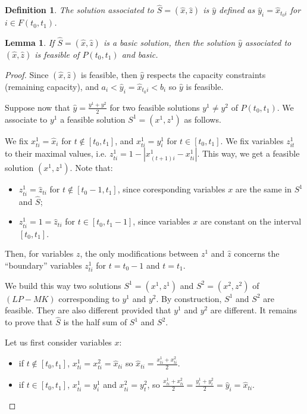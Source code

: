 \documentclass[a4paper]{book}
\newtheorem{lemma}{Lemma}[chapter]
\newtheorem{definition}{Definition}
\newtheorem{proof}{\noindent{\bf Proof.} }
\begin{document}
\begin{definition}
The solution associated to $\hat{S}=(\hat{x},\hat{z})$ is $\hat{y}$ defined as $\hat{y}_i=\hat{x}_{t_0i}$ for $i\in F(t_0,t_1)$.  
\end{definition}

\begin{lemma}\label{lem:basic}
If $\hat{S}=(\hat{x},\hat{z})$ is a basic solution, then the solution $\hat{y}$ associated to $(\hat{x},\hat{z})$ is feasible of $P(t_0,t_1)$ and basic. 
\end{lemma}

\begin{proof}
	Since $(\hat{x},\hat{z})$ is feasible, then $\hat{y}$ respects the capacity constraints (remaining capacity), and $a_i<\hat{y}_i=\hat{x}_{t_0i}<b_i$ so $\hat{y}$ is feasible.
	
	Suppose now that $\hat{y}=\frac{y^1+y^2}{2}$ for two feasible solutions $y^1\neq y^2$ of $P(t_0,t_1)$. We associate to $y^1$ a feasible solution $S^1=(x^1,z^1)$ as follows. 
	
	We fix $x^1_{ti}=\hat{x}_i$ for $t\not\in[t_0,t_1]$, and $x^1_{ti}=y^1_i$ for $t\in [t_0,t_1]$. We fix variables $z^1_{it}$ to their maximal values, i.e. $z^1_{ti}=1-|x^1_{(t+1)i}-x^1_{ti}|$. This way, we get a feasible solution $(x^1,z^1)$. Note that:
\begin{itemize}
	\item $z^1_{ti}=\hat{z}_{ti}$ for $t\not \in [t_0-1,t_1]$, since coresponding variables $x$ are the same in $S^1$ and $\hat{S}$;
	\item $z^1_{ti}=1=\hat{z}_{ti}$ for $t \in [t_0,t_1-1]$, since variables $x$ are constant on the interval $[t_0,t_1]$.
	\end{itemize} 
	Then, for variables $z$, the only modifications between $z^1$ and $\hat{z}$ concerns the ``boundary'' variables $z^1_{ti}$ for $t=t_0-1$ and $t=t_1$. 
	
We build this way two solutions $S^1=(x^1,z^1)$ and $S^2=(x^2,z^2)$ of $(LP-MK)$ corresponding to $y^1$ and $y^2$. By construction, $S^1$ and $S^2$ are feasible. They are also different provided that $y^1$ and $y^2$ are different. It remains to prove that $\hat{S}$ is the half sum of  $S^1$ and $S^2$.

Let us first consider variables $x$: 
\begin{itemize}
\item if $t\not \in [t_0,t_1]$, $x^1_{ti}=x^2_{ti}=\hat{x}_{ti}$ so $\hat{x}_{ti}=\frac{x^1_{ti}+x^2_{ti}}{2}$. 
\item if $t \in [t_0,t_1]$, $x^1_{ti}=y^1_i$ and $x^2_{ti}=y^2_t$, so $\frac{x^1_{ti}+x^2_{ti}}{2}=\frac{y^1_{i}+y^2_{i}}{2}=\hat{y}_i=\hat{x}_{ti}$.
\end{itemize}


\end{proof}
\end{document}

